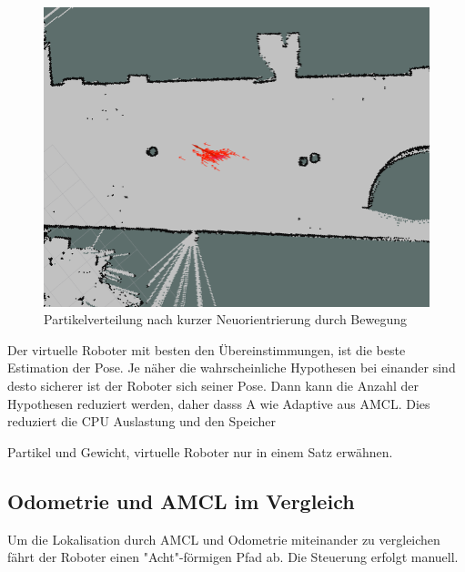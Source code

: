 \documentclass[11pt,a4paper]{article}
\begin{document}
{\begin{figure}[h]
	\includegraphics[width=\linewidth]{pictures/drive_little.jpg}
	\caption{Partikelverteilung nach kurzer Neuorientrierung durch Bewegung}
\end{figure}
 
Der virtuelle Roboter  mit besten den Übereinstimmungen, ist die beste Estimation der Pose.
Je näher die wahrscheinliche Hypothesen bei einander sind desto sicherer ist der Roboter sich seiner Pose. Dann kann die Anzahl der Hypothesen reduziert werden, daher dasss A wie Adaptive aus AMCL. Dies reduziert die CPU Auslastung und den Speicher

Partikel und Gewicht, virtuelle Roboter nur in einem Satz erwähnen.

 


\subsection{Odometrie und AMCL im Vergleich}
Um die Lokalisation durch AMCL und Odometrie miteinander zu vergleichen f\"ahrt der Roboter einen "Acht"-f\"ormigen Pfad ab. Die Steuerung erfolgt manuell.  

}
\end{document}
